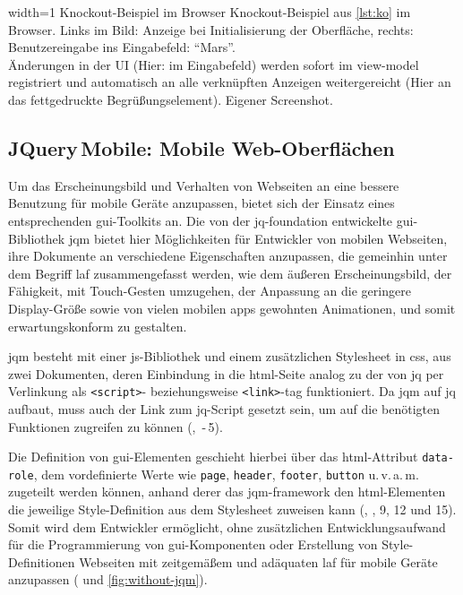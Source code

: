 	{width=1\textwidth}
	{Knockout-Beispiel im Browser}
		{Knockout-Beispiel aus \autoref{lst:ko} im Browser. Links im Bild: Anzeige bei Initialisierung der Oberfläche, rechts: Benutzereingabe ins Eingabefeld: \enquote{Mars}. \\ Änderungen in der UI (Hier: im Eingabefeld) werden sofort im \gls{view-model} registriert und automatisch an alle verknüpften Anzeigen weitergereicht (Hier an das fettgedruckte Begrüßungselement).}
	{Eigener Screenshot.}

\subsection{JQuery\,Mobile: Mobile Web-Oberflächen} \label{sec:jqm}


Um das Erscheinungsbild und Verhalten von Webseiten an eine bessere Benutzung für mobile Geräte anzupassen, bietet sich der Einsatz eines entsprechenden \gls{gui}-Toolkits an. 
Die von der \gls{jq-foundation} entwickelte \gls{gui}-Bibliothek \gls{jqm} bietet hier Möglichkeiten für Entwickler von mobilen Webseiten, ihre Dokumente an verschiedene Eigenschaften anzupassen, die gemeinhin unter dem Begriff \gls{laf} zusammengefasst werden, wie dem äußeren Erscheinungsbild, der Fähigkeit, mit Touch-Gesten umzugehen, der Anpassung an die geringere Display-Größe sowie von vielen mobilen \glspl{app} gewohnten Animationen, und somit erwartungskonform zu gestalten.

\Gls{jqm} besteht mit einer \gls{js}-Bibliothek und einem zusätzlichen Stylesheet in \gls{css}, aus zwei Dokumenten, deren Einbindung in die \gls{html}-Seite analog zu der von \gls{jq} per Verlinkung als \lstinline|<script>|- beziehungsweise \lstinline|<link>|-\gls{tag} funktioniert.
Da \gls{jqm} auf \gls{jq} aufbaut, muss auch der Link zum \gls{jq}-Script gesetzt sein, um auf die benötigten Funktionen zugreifen zu können (, \,-\,5).

	
Die Definition von \gls{gui}-Elementen geschieht hierbei über das \gls{html}-Attribut \lstinline|data-role|, dem vordefinierte Werte wie \lstinline|page|, \lstinline|header|, \lstinline|footer|, \lstinline|button| u.\,v.\,a.\,m. zugeteilt werden können, anhand derer das \gls{jqm}-\gls{framework} den \gls{html}-Elementen die jeweilige Style-Definition aus dem Stylesheet zuweisen kann (, , 9, 12 und 15).
Somit wird dem Entwickler ermöglicht, ohne zusätzlichen Entwicklungsaufwand für die Programmierung von \gls{gui}-Komponenten oder Erstellung von Style-Definitionen Webseiten mit zeitgemäßem und adäquaten \gls{laf} für mobile Geräte anzupassen ( und \ref{fig:without-jqm}).

